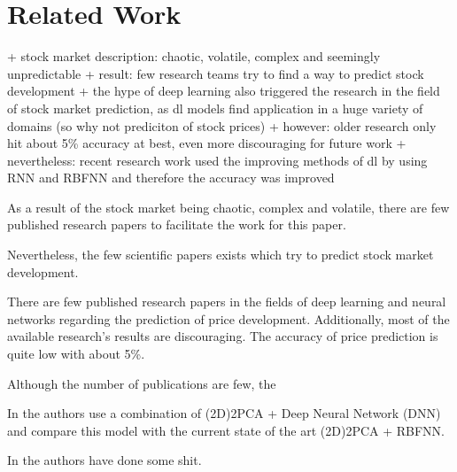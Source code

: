 \section{Related Work}
\label{sec:relatedwork}
+ stock market description: chaotic, volatile, complex and seemingly unpredictable
+ result: few research teams try to find a way to predict stock development
+ the hype of deep learning also triggered the research in the field of stock market prediction, as dl models find application in a huge variety of domains (so why not prediciton of stock prices)
+ however: older research only hit about 5\% accuracy at best, even more discouraging for future work
+ nevertheless: recent research work used the improving methods of dl by using RNN and RBFNN and therefore the accuracy was improved 

As a result of the stock market being chaotic, complex and volatile, there are few published research papers to facilitate the work for this paper. 

Nevertheless, the few scientific papers exists which try to predict stock market development. 


There are few published research papers in the fields of deep learning and neural networks regarding the prediction of price development. 
Additionally, most of the available research's results are discouraging. The accuracy of price prediction is quite low with about 5\%. 

Although the number of publications are few, the

In \cite{stockprediction01} the authors use a combination of (2D)2PCA + Deep Neural Network (DNN) and compare this model with the current state of the art (2D)2PCA + RBFNN. 

In \cite{stockprediction02} the authors have done some shit. 